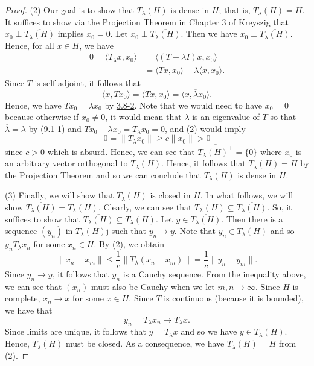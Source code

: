 \begin{proof}
    (2) Our goal is to show that \( {T}_{\lambda}(H) \) is dense in \( H  \); that is, \( \overline{{T}_{\lambda}(H)} = H  \). It suffices to show via the Projection Theorem in Chapter 3 of \cite{Kreyszig} Kreyszig that \( {x}_{0} \perp \overline{{T}_{\lambda}(H)} \) implies \( {x}_{0} = 0  \). Let \( {x}_{0} \perp \overline{{T}_{\lambda}(H)} \). Then we have \( {x}_{0} \perp \overline{{T}_{\lambda}(H)} \). Hence, for all \( x \in H  \), we have 
    \begin{align*}
        0 = \langle {T}_{\lambda}x  , {x}_{0} \rangle &= \langle (T - \lambda I)x , {x}_{0}  \rangle \\
                                                      &= \langle Tx  , {x}_{0} \rangle - \lambda \langle x  , {x}_{0} \rangle.
\end{align*}
Since \( T  \) is self-adjoint, it follows that 
\[  \langle x , T {x}_{0} \rangle = \langle Tx  , {x}_{0} \rangle = \langle x , \overline{\lambda} {x}_{0} \rangle. \]
Hence, we have \( T {x}_{0} = \overline{\lambda} {x}_{0} \) by {\hyperref[3.8-2]{3.8-2}}. Note that we would need to have \( {x}_{0} = 0  \) because otherwise if \( {x}_{0} \neq 0  \), it would mean that \( \overline{\lambda}  \) is an eigenvalue of \( T  \) so that \( \overline{\lambda} = \lambda  \) by {\hyperref[(9.1-1)]{(9.1-1)}} and \( T {x}_{0} - \lambda {x}_{0} = {T}_{\lambda}{x}_{0} = 0  \), and (2) would imply  
\[  0 = \|{T}_{\lambda} {x}_{0} \| \geq c \|{x}_{0}\| >  0  \]
since \( c > 0  \) which is absurd. Hence, we can see that \( \overline{{T}_{\lambda}(H)^{\perp}} = \{ 0  \}   \) where \( {x}_{0} \) is an arbitrary vector orthogonal to \( {T}_{\lambda}(H) \). Hence, it follows that \( \overline{{T}_{\lambda}(H)} = H  \) by the Projection Theorem and so we can conclude that \( {T}_{\lambda}(H)  \) is dense in \( H  \).

(3) Finally, we will show that \( {T}_{\lambda}(H) \) is closed in \( H  \). In what follows, we will show \( \overline{{T}_{\lambda}(H)} = {T}_{\lambda}(H) \). Clearly, we can see that \( {T}_{\lambda}(H) \subseteq \overline{{T}_{\lambda}(H)} \). So, it suffices to show that \( \overline{{T}_{\lambda}(H)} \subseteq  {T}_{\lambda}(H) \). Let \( y \in \overline{{T}_{\lambda}(H)} \). Then there is a sequence \( (y_{n}) \) in \( {T}_{\lambda}(H) \)j such that \( {y}_{n} \to y \). Note that \( {y}_{n} \in {T}_{\lambda}(H) \) and so \( {y}_{n} {T}_{\lambda} {x}_{n} \) for some \( {x}_{n} \in H  \). By (2), we obtain 
\[ \|{x}_{n} - {x}_{m}\| \leq \frac{ 1 }{ c }  \|{T}_{\lambda}({x}_{n} - {x}_{m})\| = \frac{ 1 }{ c }  \|{y}_{n} - {y}_{m}\|.  \]
Since \( {y}_{n} \to y  \), it follows that \( {y}_{n} \) is a Cauchy sequence. From the inequality above, we can see that \( ({x}_{n}) \) must also be Cauchy when we let \( m,n \to \infty  \). Since \( H  \) is complete, \( {x}_{n} \to x  \) for some \( x \in H \). Since \( T  \) is continuous (because it is bounded), we have that 
\[  {y}_{n} = {T}_{\lambda}{x}_{n} \to {T}_{\lambda}x. \]
Since limits are unique, it follows that \( y = {T}_{\lambda}x \) and so we have \( y \in {T}_{\lambda}(H) \). Hence, \( {T}_{\lambda}(H) \) must be closed. As a consequence, we have \( {T}_{\lambda}(H) = H  \) from (2).


\end{proof}

